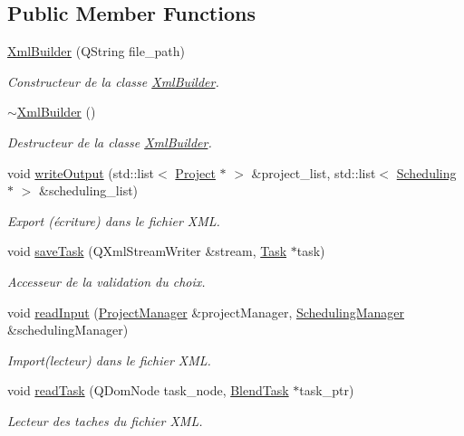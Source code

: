 \subsection*{Public Member Functions}
\begin{DoxyCompactItemize}
\item 
\hyperlink{class_xml_builder_aa60c67d6dfe1cf6262ef1f1e93cddbd2}{Xml\+Builder} (Q\+String file\+\_\+path)
\begin{DoxyCompactList}\small\item\em Constructeur de la classe \hyperlink{class_xml_builder}{Xml\+Builder}. \end{DoxyCompactList}\item 
\hyperlink{class_xml_builder_a56d4fcf0271d8c7fe760528f5f41f19d}{$\sim$\+Xml\+Builder} ()
\begin{DoxyCompactList}\small\item\em Destructeur de la classe \hyperlink{class_xml_builder}{Xml\+Builder}. \end{DoxyCompactList}\item 
void \hyperlink{class_xml_builder_a002af47c0db8797c0986cb659c8567c1}{write\+Output} (std\+::list$<$ \hyperlink{class_project}{Project} $\ast$ $>$ \&project\+\_\+list, std\+::list$<$ \hyperlink{class_scheduling}{Scheduling} $\ast$ $>$ \&scheduling\+\_\+list)
\begin{DoxyCompactList}\small\item\em Export (écriture) dans le fichier X\+M\+L. \end{DoxyCompactList}\item 
void \hyperlink{class_xml_builder_aba1e1fe5161a5a4b4578eb95013accd8}{save\+Task} (Q\+Xml\+Stream\+Writer \&stream, \hyperlink{class_task}{Task} $\ast$task)
\begin{DoxyCompactList}\small\item\em Accesseur de la validation du choix. \end{DoxyCompactList}\item 
void \hyperlink{class_xml_builder_ac42cb9c7614a3414609cdcaf2d0cb858}{read\+Input} (\hyperlink{class_project_manager}{Project\+Manager} \&project\+Manager, \hyperlink{class_scheduling_manager}{Scheduling\+Manager} \&scheduling\+Manager)
\begin{DoxyCompactList}\small\item\em Import(lecteur) dans le fichier X\+M\+L. \end{DoxyCompactList}\item 
void \hyperlink{class_xml_builder_ade2ff6ec6f5820ceedd7fbea1dfbf473}{read\+Task} (Q\+Dom\+Node task\+\_\+node, \hyperlink{class_blend_task}{Blend\+Task} $\ast$task\+\_\+ptr)
\begin{DoxyCompactList}\small\item\em Lecteur des taches du fichier X\+M\+L. \end{DoxyCompactList}\end{DoxyCompactItemize}
